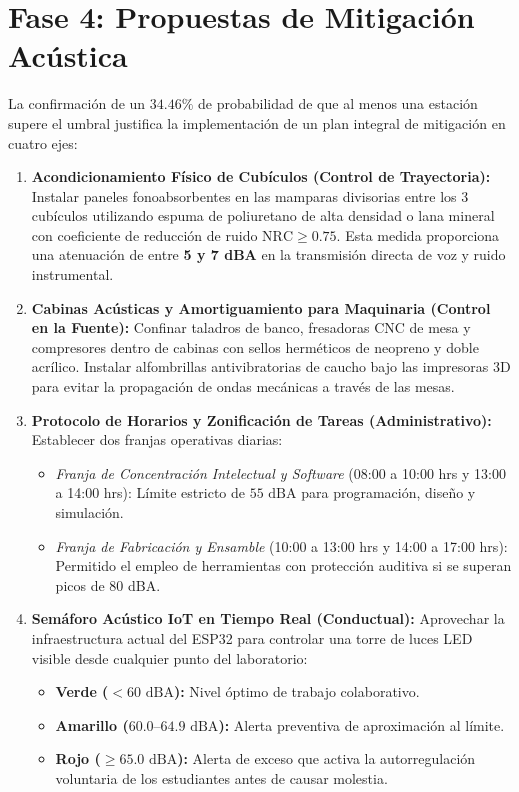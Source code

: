 \documentclass{article}
\begin{document}
\section{Fase 4: Propuestas de Mitigación Acústica}
La confirmación de un $34.46\%$ de probabilidad de que al menos una estación supere el umbral justifica la implementación de un plan integral de mitigación en cuatro ejes:

\begin{enumerate}
    \item \textbf{Acondicionamiento Físico de Cubículos (Control de Trayectoria):}
    Instalar paneles fonoabsorbentes en las mamparas divisorias entre los 3 cubículos utilizando espuma de poliuretano de alta densidad o lana mineral con coeficiente de reducción de ruido $\text{NRC} \ge 0.75$. Esta medida proporciona una atenuación de entre \textbf{5 y 7 dBA} en la transmisión directa de voz y ruido instrumental.
    
    \item \textbf{Cabinas Acústicas y Amortiguamiento para Maquinaria (Control en la Fuente):}
    Confinar taladros de banco, fresadoras CNC de mesa y compresores dentro de cabinas con sellos herméticos de neopreno y doble acrílico. Instalar alfombrillas antivibratorias de caucho bajo las impresoras 3D para evitar la propagación de ondas mecánicas a través de las mesas.
    
    \item \textbf{Protocolo de Horarios y Zonificación de Tareas (Administrativo):}
    Establecer dos franjas operativas diarias:
    \begin{itemize}
        \item \textit{Franja de Concentración Intelectual y Software} (08:00 a 10:00 hrs y 13:00 a 14:00 hrs): Límite estricto de $55\text{ dBA}$ para programación, diseño y simulación.
        \item \textit{Franja de Fabricación y Ensamble} (10:00 a 13:00 hrs y 14:00 a 17:00 hrs): Permitido el empleo de herramientas con protección auditiva si se superan picos de 80 dBA.
    \end{itemize}
    
    \item \textbf{Semáforo Acústico IoT en Tiempo Real (Conductual):}
    Aprovechar la infraestructura actual del ESP32 para controlar una torre de luces LED visible desde cualquier punto del laboratorio:
    \begin{itemize}
        \item \textbf{Verde ($< 60\text{ dBA}$):} Nivel óptimo de trabajo colaborativo.
        \item \textbf{Amarillo ($60.0\text{--}64.9\text{ dBA}$):} Alerta preventiva de aproximación al límite.
        \item \textbf{Rojo ($\ge 65.0\text{ dBA}$):} Alerta de exceso que activa la autorregulación voluntaria de los estudiantes antes de causar molestia.
    \end{itemize}
\end{enumerate}
\end{document}
